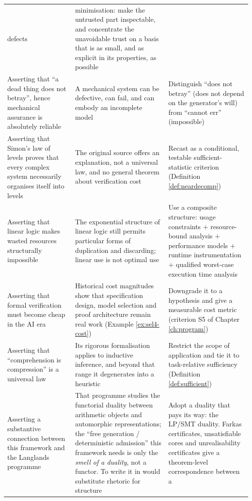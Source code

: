 \begin{longtable}{L{3.4cm}L{5.2cm}L{5.6cm}}
  defects &
  \TCB{} minimisation: make the untrusted part inspectable, and concentrate the unavoidable
  trust on a basis that is as small, and as explicit in its properties, as possible \\
Asserting that ``a dead thing does not betray'', hence mechanical assurance is absolutely
  reliable &
  A mechanical system can be defective, can fail, and can embody an incomplete model &
  Distinguish ``does not betray'' (does not depend on the generator's will) from ``cannot
  err'' (impossible) \\
Asserting that Simon's law of levels proves that every complex system necessarily organises
  itself into levels &
  The original source offers an explanation, not a universal law, and no general theorem
  about verification cost &
  Recast as a conditional, testable sufficient-statistic criterion
  (Definition \ref{def:neardecomp}) \\
Asserting that linear logic makes wasted resources structurally impossible &
  The exponential structure of linear logic still permits particular forms of duplication
  and discarding; linear use is not optimal use &
  Use a composite structure: usage constraints $+$ resource-bound analysis $+$ performance
  models $+$ runtime instrumentation $+$ qualified worst-case execution time analysis \\
Asserting that formal verification must become cheap in the AI era &
  Historical cost magnitudes show that specification design, model selection and proof
  architecture remain real work (Example \ref{ex:sel4-cost}) &
  Downgrade it to a hypothesis and give a measurable cost metric (criterion S5 of Chapter
  \ref{ch:program}) \\
Asserting that ``comprehension is compression'' is a universal law &
  Its rigorous formalisation applies to inductive inference, and beyond that range it
  degenerates into a heuristic &
  Restrict the scope of application and tie it to task-relative sufficiency
  (Definition \ref{def:sufficient}) \\
Asserting a substantive connection between this framework and the Langlands programme &
  That programme studies the functorial duality between arithmetic objects and automorphic
  representations; the ``free generation / deterministic admission'' this framework needs
  is only the \emph{smell of a duality}, not a functor. To write it in would substitute
  rhetoric for structure &
  Adopt a duality that pays its way: the LP/SMT duality. Farkas certificates, unsatisfiable
  cores and unrealisability certificates give a theorem-level correspondence between a

\end{longtable}
